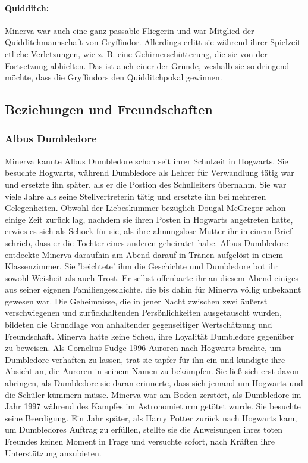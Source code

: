 \documentclass[a4paper, 10pt]{article}
\begin{document}
\paragraph{Quidditch:} 
Minerva war auch eine ganz passable Fliegerin und war Mitglied der Quidditchmannschaft von Gryffindor. Allerdings erlitt sie während ihrer Spielzeit etliche Verletzungen, wie z. B. eine Gehirnerschütterung, die sie von der Fortsetzung abhielten. Das ist auch einer der Gründe, weshalb sie so dringend möchte, dass die Gryffindors den Quidditchpokal gewinnen.
\subsection*{\Large Beziehungen und Freundschaften}
\subsubsection*{\large Albus Dumbledore}
Minerva kannte Albus Dumbledore schon seit ihrer Schulzeit in Hogwarts. Sie besuchte Hogwarts, während Dumbledore als Lehrer für Verwandlung tätig war und ersetzte ihn später, als er die Postion des Schulleiters übernahm. Sie war viele Jahre als seine Stellvertreterin tätig und ersetzte ihn bei mehreren Gelegenheiten.
\vspace{10pt}
\newline
Obwohl der Liebeskummer bezüglich Dougal McGregor schon einige Zeit zurück lag, nachdem sie ihren Posten in Hogwarts angetreten hatte, erwies es sich als Schock für sie, als ihre ahnungslose Mutter ihr in einem Brief schrieb, dass er die Tochter eines anderen geheiratet habe. Albus Dumbledore entdeckte Minerva daraufhin am Abend darauf in Tränen aufgelöst in einem
Klassenzimmer. Sie 'beichtete' ihm die Geschichte und Dumbledore bot ihr sowohl Weisheit als auch Trost. Er selbst offenbarte ihr an diesem Abend einiges aus seiner eigenen Familiengeschichte, die bis dahin für Minerva völlig unbekannt gewesen war. Die Geheimnisse, die in jener Nacht zwischen zwei äußerst verschwiegenen und zurückhaltenden Persönlichkeiten ausgetauscht wurden, bildeten die Grundlage von anhaltender gegenseitiger Wertschätzung und Freundschaft.
\vspace{10pt}
\newline
Minerva hatte keine Scheu, ihre Loyalität Dumbledore gegenüber zu beweisen. Als Cornelius Fudge 1996 Auroren nach Hogwarts brachte, um Dumbledore verhaften zu lassen, trat sie tapfer für ihn ein und kündigte ihre Absicht an, die Auroren in seinem Namen zu bekämpfen. Sie ließ sich erst davon abringen, als Dumbledore sie daran erinnerte, dass sich jemand um Hogwarts und die Schüler kümmern müsse.
\vspace{10pt}
\newline
Minerva war am Boden zerstört, als Dumbledore im Jahr 1997 während des Kampfes im Astronomieturm getötet wurde. Sie besuchte seine Beerdigung. Ein Jahr später, als Harry Potter zurück nach Hogwarts kam, um Dumbledores Auftrag zu erfüllen, stellte sie die Anweisungen ihres toten Freundes keinen Moment in Frage und versuchte sofort, nach Kräften ihre Unterstützung anzubieten.
\end{document}
